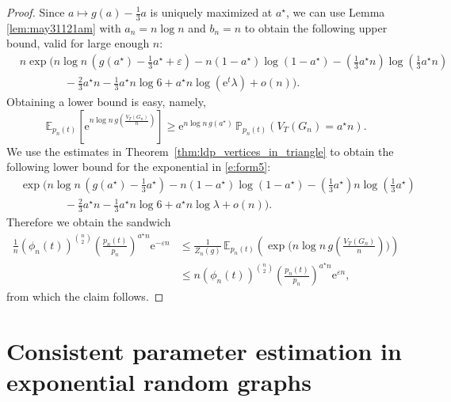 \documentclass[bj,authoryear,noshowframe]{imsart}
\numberwithin{equation}{section}
\theoremstyle{plain}
\theoremstyle{definition}
\newcommand{\e}{{\mathrm e}}
\begin{document}
\begin{proof}
Since $a\mapsto g(a)-\tfrac13 a$ is uniquely maximized at $a^\star$, we can use Lemma \ref{lem:may31121am} with $a_n=n\log{n}$ and $b_n=n$ to obtain the following upper bound, valid for large enough $n$:
	\begin{equation}
	\label{e:form5}
	\begin{aligned}
	&n \exp\Big(n\log{n}\,(g(a^\star)- \tfrac13a^\star +\varepsilon) - n(1-a^\star) \log(1-a^\star) 
	- (\tfrac13 a^\star n) \log(\tfrac13a^\star n)\\
	&\qquad \qquad -\tfrac23 a^\star n -\tfrac13a^\star n\log{6}+a^\star n\log{(\e^t \lambda)} +o(n)\Big).
	\end{aligned}
	\end{equation}
Obtaining a lower bound is easy, namely,
	\begin{equation}
	\mathbb{E}_{p_n(t)}\left[\e^{n\log{n}\,g(\tfrac{V_{ T}(G_n)}{n})}\right]
	\geq  \mathrm{e}^{n\log{n}\, g\left(a^\star\right)}\,\mathbb{P}_{p_n(t)}(V_{T}(G_n)=a^\star n).
	\end{equation}
We use the estimates in Theorem~\ref{thm:ldp_vertices_in_triangle} to obtain the following lower bound for the exponential in \eqref{e:form5}:
	\begin{equation}
	\begin{aligned}
	&\exp\Big(n\log{n}\,(g(a^\star)- \tfrac13a^\star) -n(1-a^\star) \log(1-a^\star) - (\tfrac13a^\star)n\log(\tfrac13a^\star)\\ 
	&\qquad\qquad  - \tfrac23 a^\star n - \tfrac13 a^\star n \log{6} + a^\star n\log{\lambda} +o(n)\Big).
	\end{aligned}
	\end{equation}
Therefore we obtain the sandwich 
	\begin{equation}
	\begin{aligned}
	\frac{1}{n} \left(\phi_n(t)\right)^{{n\choose 2}}\left(\frac{p_n(t)}{p_n}\right)^{a^\star n} \e^{-\varepsilon n}
	&\leq \frac{1}{Z_n(g)}\, \mathbb{E}_{p_n(t)}\left(\exp{\big(n\log{n}\, g(\tfrac{V_{ T}(G_n)}{n})\big)}\right)\\ 
	&\leq n \left(\phi_n(t)\right)^{{n\choose 2}} 
	\left(\frac{p_n(t)}{p_n}\right)^{a^\star n} \e^{\varepsilon n},
	\end{aligned}
	\end{equation}
from which the claim follows.
\end{proof}


\section{Consistent parameter estimation in exponential random graphs}
\label{sec-consistent-estimation-ERGs}
\end{document}

